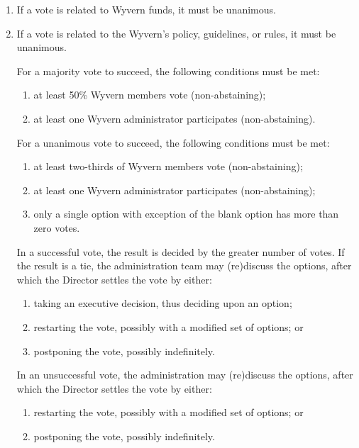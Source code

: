 \begin{enumerate}
    \item \label{itm:vote-money} If a vote is related to Wyvern funds, it must be unanimous.

    \item \label{itm:vote-policy} If a vote is related to the Wyvern's policy, guidelines, or rules, it must be unanimous.

    \begin{item}
        For a majority vote to succeed, the following conditions must be met:
        \begin{enumerate}
            \item at least 50\% Wyvern members vote (non-abstaining);
            \item at least one Wyvern administrator participates (non-abstaining).
        \end{enumerate}
    \end{item}

    \begin{item}
        For a unanimous vote to succeed, the following conditions must be met:
        \begin{enumerate}
            \item at least two-thirds of Wyvern members vote (non-abstaining);
            \item at least one Wyvern administrator participates (non-abstaining);
            \item only a single option with exception of the blank option has more than zero votes.
        \end{enumerate}
    \end{item}

    \begin{item}
        In a successful vote, the result is decided by the greater number of votes. If the result is a tie, the administration team may (re)discuss the options, after which the Director settles the vote by either:
        \begin{enumerate}
            \item taking an executive decision, thus deciding upon an option;
            \item restarting the vote, possibly with a modified set of options; or
            \item postponing the vote, possibly indefinitely.
        \end{enumerate}
    \end{item}

    \begin{item}
        In an unsuccessful vote, the administration may (re)discuss the options, after which the Director settles the vote by either:
        \begin{enumerate}
            \item restarting the vote, possibly with a modified set of options; or
            \item postponing the vote, possibly indefinitely.
        \end{enumerate}
    \end{item}

\end{enumerate}
